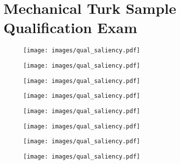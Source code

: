 \chapter{Mechanical Turk Sample Qualification Exam}\label{appendix:qual}

\begin{figure}[htop]
 \centering 
 \texttt{[image: images/qual\_saliency.pdf]}
\end{figure}

\begin{figure}[htop]
 \centering 
 \texttt{[image: images/qual\_saliency.pdf]}
\end{figure}

\begin{figure}[htop]
 \centering 
 \texttt{[image: images/qual\_saliency.pdf]}
\end{figure}

\begin{figure}[htop]
 \centering 
 \texttt{[image: images/qual\_saliency.pdf]}
\end{figure}

\begin{figure}[htop]
 \centering 
 \texttt{[image: images/qual\_saliency.pdf]}
\end{figure}

\begin{figure}[htop]
 \centering 
 \texttt{[image: images/qual\_saliency.pdf]}
\end{figure}

\begin{figure}[htop]
 \centering 
 \texttt{[image: images/qual\_saliency.pdf]}
\end{figure}

\begin{figure}[htop]
 \centering 
 \texttt{[image: images/qual\_saliency.pdf]}
\end{figure}